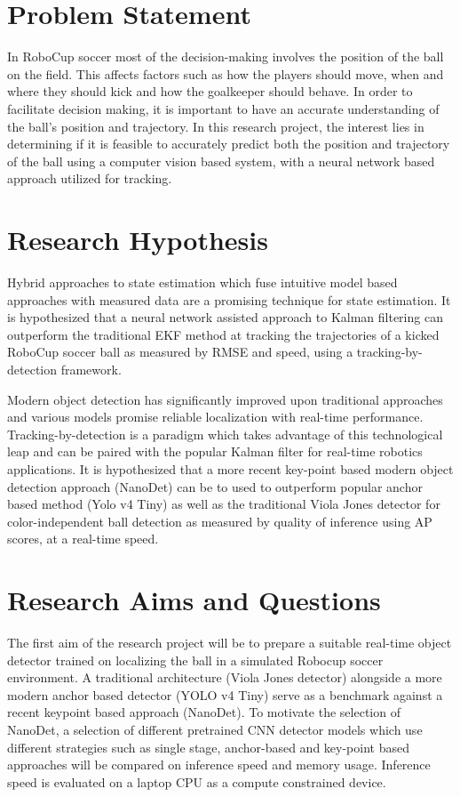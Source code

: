 \documentclass[a4paper,twoside,12pt]{report}
\begin{document}
\section{Problem Statement}

In RoboCup soccer most of the decision-making involves the position of the ball on the field. This affects factors such as how the players should move, when and where they should kick and how the goalkeeper should behave. In order to facilitate decision making, it is important to have an accurate understanding of the ball’s position and trajectory. In this research project, the interest lies in determining if it is feasible to accurately predict both the position and trajectory of the ball using a computer vision based system, with a neural network based approach utilized for tracking.

\section{Research Hypothesis}

Hybrid approaches to state estimation which fuse intuitive model based approaches with measured data are a promising technique for state estimation. It is hypothesized that a neural network assisted approach to Kalman filtering can outperform the traditional EKF method at tracking the trajectories of a kicked RoboCup soccer ball as measured by RMSE and speed, using a tracking-by-detection framework.

Modern object detection has significantly improved upon traditional approaches and various models promise reliable localization with real-time performance. Tracking-by-detection is a paradigm which takes advantage of this technological leap and can be paired with the popular Kalman filter for real-time robotics applications. It is hypothesized that a more recent key-point based modern object detection approach (NanoDet) can be to used to outperform popular anchor based method (Yolo v4 Tiny) as well as the traditional Viola Jones detector for color-independent ball detection as measured by quality of inference using AP scores, at a real-time speed. 

\section{Research Aims and Questions}

The first aim of the research project will be to prepare a suitable real-time object detector trained on localizing the ball in a simulated Robocup soccer environment. A traditional architecture (Viola Jones detector) alongside a more modern anchor based detector (YOLO v4 Tiny) serve as a benchmark against a recent keypoint based approach (NanoDet). To motivate the selection of NanoDet, a selection of different pretrained CNN detector models which use different strategies such as single stage, anchor-based and key-point based approaches will be compared on inference speed and memory usage. Inference speed is evaluated on a laptop CPU as a compute constrained device. 
\end{document}
